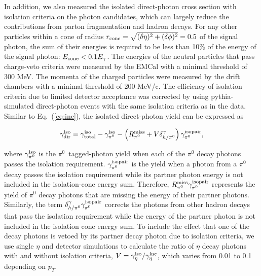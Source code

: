 \documentclass[twocolumn,letterpaper,aps,prl,longbibliography,superscriptaddress,floatfix]{revtex4-2}
\newcommand{\pT}{\mbox{$p_T$}\xspace}
\newcommand{\pizero}{\mbox{$\pi^0$}\xspace}
\begin{document}
In addition, we also measured the isolated direct-photon cross section 
with isolation criteria on the photon candidates, which can largely 
reduce the contributions from parton fragmentation and hadron decays. 
For any other particles within a cone of radius $r_{{\rm cone}} = 
\sqrt{(\delta\eta)^2 + (\delta\phi)^2} = 0.5$ of the signal photon, the 
sum of their energies is required to be less than 10\% of the energy of 
the signal photon: $E_{{\rm cone}} < 0.1 E_{\gamma}$. The energies of 
the neutral particles that pass charge-veto criteria were measured by 
the EMCal with a minimal threshold of 300 MeV. The momenta of the 
charged particles were measured by the drift chambers with a minimal 
threshold of 200 MeV/c. The efficiency of isolation criteria due to 
limited detector acceptance was corrected by using {\sc pythia}-simulated 
direct-photon events with the same isolation criteria as in the data. 
Similar to Eq.~(\ref{eq:inc}), the isolated direct-photon yield can be 
expressed as

\begin{equation} \label{eq:iso}
\gamma_{{\rm dir}}^{{\rm iso}} = \gamma_{{\rm total}}^{{\rm iso}} - \gamma_{\pi^0}^{{\rm iso}} - \left( R_{\pi^0}^{{\rm miss}} + V\delta_{h/\pi^0}^{\gamma} \right) \gamma_{\pi^0}^{{\rm isopair}},
\end{equation}

where $\gamma_{\pi^0}^{{\rm iso}}$ is the \pizero \ tagged-photon yield 
when each of the \pizero decay photons passes the isolation 
requirement. $\gamma_{\pi^0}^{{\rm isopair}}$ is the yield when a 
photon from a \pizero decay passes the isolation requirement while its 
partner photon energy is not included in the isolation-cone energy sum. 
Therefore, $R_{\pi^0}^{{\rm miss}}\gamma_{\pi^0}^{{\rm isopair}}$ 
represents the yield of \pizero decay photons that are missing the energy
of their partner photons. 
Similarly, the term $\delta_{h/\pi^0}^{\gamma}\gamma_{\pi^0}^{{\rm isopair}}$ corrects the 
photons from other hadron decays that pass the isolation requirement 
while the energy of the partner photon is not included in the isolation cone 
energy sum.  To include the effect that one of the decay photons is 
vetoed by its partner decay photon due to isolation criteria, we use 
single $\eta$ and detector simulations to calculate the ratio of $\eta$ 
decay photons with and without isolation criteria, 
$V=\gamma^{{\rm iso}}_{\eta}/\gamma^{{\rm inc}}_{\eta}$, which varies 
from 0.01 to 0.1 depending on \pT.

\end{document}
